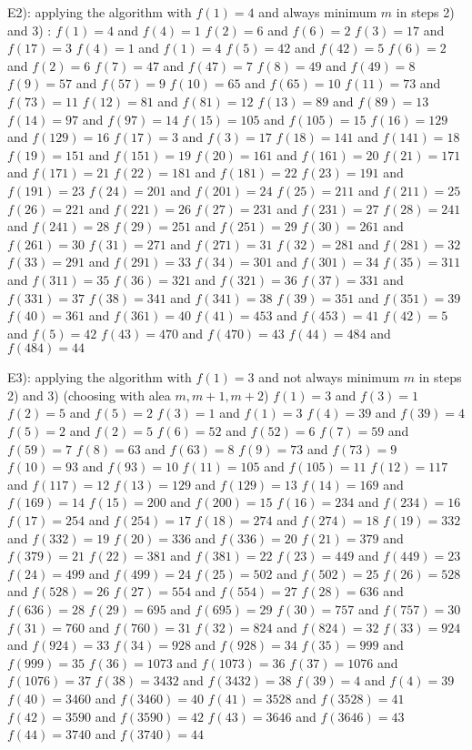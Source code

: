 \begin{solution}
E2): applying the algorithm with $f(1)=4$ and always minimum $m$ in steps 2) and 3) :
$f(1)=4$ and $f(4)=1$
$f(2)=6$ and $f(6)=2$
$f(3)=17$ and $f(17)=3$
$f(4)=1$ and $f(1)=4$
$f(5)=42$ and $f(42)=5$
$f(6)=2$ and $f(2)=6$
$f(7)=47$ and $f(47)=7$
$f(8)=49$ and $f(49)=8$
$f(9)=57$ and $f(57)=9$
$f(10)=65$ and $f(65)=10$
$f(11)=73$ and $f(73)=11$
$f(12)=81$ and $f(81)=12$
$f(13)=89$ and $f(89)=13$
$f(14)=97$ and $f(97)=14$
$f(15)=105$ and $f(105)=15$
$f(16)=129$ and $f(129)=16$
$f(17)=3$ and $f(3)=17$
$f(18)=141$ and $f(141)=18$
$f(19)=151$ and $f(151)=19$
$f(20)=161$ and $f(161)=20$
$f(21)=171$ and $f(171)=21$
$f(22)=181$ and $f(181)=22$
$f(23)=191$ and $f(191)=23$
$f(24)=201$ and $f(201)=24$
$f(25)=211$ and $f(211)=25$
$f(26)=221$ and $f(221)=26$
$f(27)=231$ and $f(231)=27$
$f(28)=241$ and $f(241)=28$
$f(29)=251$ and $f(251)=29$
$f(30)=261$ and $f(261)=30$
$f(31)=271$ and $f(271)=31$
$f(32)=281$ and $f(281)=32$
$f(33)=291$ and $f(291)=33$
$f(34)=301$ and $f(301)=34$
$f(35)=311$ and $f(311)=35$
$f(36)=321$ and $f(321)=36$
$f(37)=331$ and $f(331)=37$
$f(38)=341$ and $f(341)=38$
$f(39)=351$ and $f(351)=39$
$f(40)=361$ and $f(361)=40$
$f(41)=453$ and $f(453)=41$
$f(42)=5$ and $f(5)=42$
$f(43)=470$ and $f(470)=43$
$f(44)=484$ and $f(484)=44$

E3): applying the algorithm with $f(1)=3$ and not always minimum $m$ in steps 2) and 3) (choosing with alea $m,m+1,m+2$)
$f(1)=3$ and $f(3)=1$
$f(2)=5$ and $f(5)=2$
$f(3)=1$ and $f(1)=3$
$f(4)=39$ and $f(39)=4$
$f(5)=2$ and $f(2)=5$
$f(6)=52$ and $f(52)=6$
$f(7)=59$ and $f(59)=7$
$f(8)=63$ and $f(63)=8$
$f(9)=73$ and $f(73)=9$
$f(10)=93$ and $f(93)=10$
$f(11)=105$ and $f(105)=11$
$f(12)=117$ and $f(117)=12$
$f(13)=129$ and $f(129)=13$
$f(14)=169$ and $f(169)=14$
$f(15)=200$ and $f(200)=15$
$f(16)=234$ and $f(234)=16$
$f(17)=254$ and $f(254)=17$
$f(18)=274$ and $f(274)=18$
$f(19)=332$ and $f(332)=19$
$f(20)=336$ and $f(336)=20$
$f(21)=379$ and $f(379)=21$
$f(22)=381$ and $f(381)=22$
$f(23)=449$ and $f(449)=23$
$f(24)=499$ and $f(499)=24$
$f(25)=502$ and $f(502)=25$
$f(26)=528$ and $f(528)=26$
$f(27)=554$ and $f(554)=27$
$f(28)=636$ and $f(636)=28$
$f(29)=695$ and $f(695)=29$
$f(30)=757$ and $f(757)=30$
$f(31)=760$ and $f(760)=31$
$f(32)=824$ and $f(824)=32$
$f(33)=924$ and $f(924)=33$
$f(34)=928$ and $f(928)=34$
$f(35)=999$ and $f(999)=35$
$f(36)=1073$ and $f(1073)=36$
$f(37)=1076$ and $f(1076)=37$
$f(38)=3432$ and $f(3432)=38$
$f(39)=4$ and $f(4)=39$
$f(40)=3460$ and $f(3460)=40$
$f(41)=3528$ and $f(3528)=41$
$f(42)=3590$ and $f(3590)=42$
$f(43)=3646$ and $f(3646)=43$
$f(44)=3740$ and $f(3740)=44$
\end{solution}



